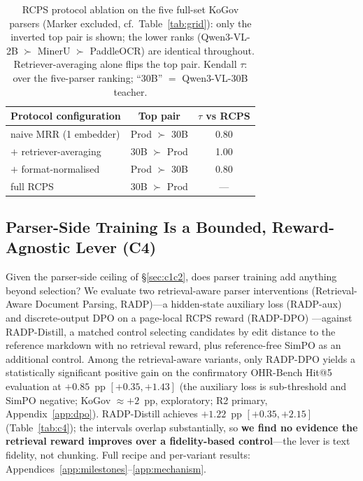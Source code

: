 \documentclass[11pt]{article}
\newcommand{\rcps}{\textsc{RCPS}}
\begin{document}
\begin{table}[t]
\centering\footnotesize
\setlength{\tabcolsep}{3pt}
\begin{tabular}{lcc}
\toprule
Protocol configuration & Top pair & $\tau$ vs \rcps{} \\
\midrule
naive MRR (1 embedder) & Prod $\succ$ 30B & 0.80 \\
$+$ retriever-averaging & 30B $\succ$ Prod & 1.00 \\
$+$ format-normalised & Prod $\succ$ 30B & 0.80 \\
full \rcps{} & 30B $\succ$ Prod & --- \\
\bottomrule
\end{tabular}
\caption{\rcps{} protocol ablation on the five full-set KoGov parsers (Marker excluded, cf.\ Table~\ref{tab:grid}): only the inverted top pair is shown; the lower ranks (Qwen3-VL-2B $\succ$ MinerU $\succ$ PaddleOCR) are identical throughout. Retriever-averaging alone flips the top pair. Kendall $\tau$: over the five-parser ranking; ``30B'' $=$ Qwen3-VL-30B teacher.}
\label{tab:ablation}
\end{table}

\subsection{Parser-Side Training Is a Bounded, Reward-Agnostic Lever (C4)}
\label{sec:c4}\label{sec:mechanism}

Given the parser-side ceiling of \S\ref{sec:c1c2}, does parser training add anything beyond selection? We evaluate two retrieval-aware parser interventions (Retrieval-Aware Document Parsing, RADP)---a hidden-state auxiliary loss (RADP-aux) and discrete-output DPO on a page-local \rcps{} reward (RADP-DPO) \citep{rafailov2023dpo}---against RADP-Distill, a matched control selecting candidates by edit distance to the reference markdown with no retrieval reward, plus reference-free SimPO \citep{meng2024simpo} as an additional control. Among the retrieval-aware variants, only RADP-DPO yields a statistically significant positive gain on the confirmatory OHR-Bench Hit@5 evaluation at $+0.85$~pp $[+0.35, +1.43]$ (the auxiliary loss is sub-threshold and SimPO negative; KoGov $\approx{+}2$~pp, exploratory; R2 primary, Appendix~\ref{app:dpo}). RADP-Distill achieves $+1.22$~pp $[+0.35, +2.15]$ (Table~\ref{tab:c4}); the intervals overlap substantially, so \textbf{we find no evidence the retrieval reward improves over a fidelity-based control}---the lever is text fidelity, not chunking. Full recipe and per-variant results: Appendices~\ref{app:milestones}--\ref{app:mechanism}.
\end{document}
